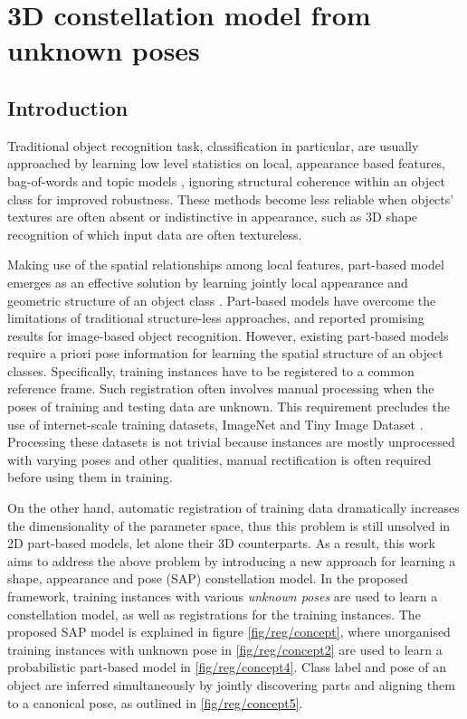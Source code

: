 \chapter{3D constellation model from unknown poses}
\label{chap/reg}

\section{Introduction}
\label{sec/reg/intro}

Traditional object recognition task, classification in particular, are usually approached by learning low level statistics on local, appearance based features, \eg bag-of-words \cite{Sivic2005, Fei-Fei2005} and topic models \cite{Fergus2005}, ignoring structural coherence within an object class for improved robustness. These methods become less reliable when objects' textures are often absent or indistinctive in appearance, such as 3D shape recognition of which input data are often textureless. 

Making use of the spatial relationships among local features, part-based model emerges as an effective solution by learning jointly local appearance and geometric structure of an object class \cite{Weber2000, Felzenszwalb2005, Fergus2007}. 
Part-based models have overcome the limitations of traditional structure-less approaches, and reported promising results for image-based object recognition. However, existing part-based models require a priori pose information for learning the spatial structure of an object classes. Specifically, training instances have to be registered to a common reference frame. Such registration often involves manual processing when the poses of training and testing data are unknown. This requirement precludes the use of internet-scale training datasets, \eg ImageNet \cite{Deng2009} and Tiny Image Dataset \cite{Torralba2008}. Processing these datasets is not trivial because instances are mostly unprocessed with varying poses and other qualities, manual rectification is often required before using them in training. 

On the other hand, automatic registration of training data dramatically increases the dimensionality of the parameter space, thus this problem is still unsolved in 2D part-based models, let alone their 3D counterparts. 
As a result, this work aims to address the above problem by introducing a new approach for learning a shape, appearance and pose (SAP) constellation model. 
In the proposed framework, training instances with various \emph{unknown poses} are used to learn a constellation model, as well as registrations for the training instances. The proposed SAP model is explained in figure \ref{fig/reg/concept}, where unorganised training instances with unknown pose in \ref{fig/reg/concept2} are used to learn a probabilistic part-based model in \ref{fig/reg/concept4}. Class label and pose of an object are inferred simultaneously by jointly discovering parts and aligning them to a canonical pose, as outlined in \ref{fig/reg/concept5}. 

